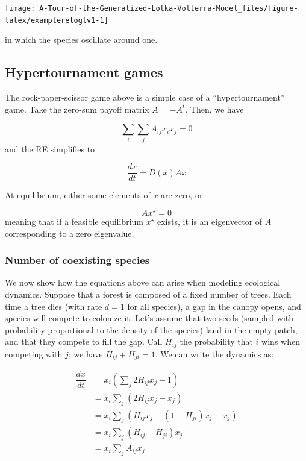 \documentclass[
]{book}
\begin{document}
\begin{center}\texttt{[image: A-Tour-of-the-Generalized-Lotka-Volterra-Model\_files/figure-latex/exampleretoglv1-1]} \end{center}

in which the species oscillate around one.

\hypertarget{hypertournament-games}{%
\subsection{Hypertournament games}\label{hypertournament-games}}

The rock-paper-scissor game above is a simple case of a ``hypertournament'' game. Take the zero-sum payoff matrix \(A = -A^t\). Then, we have

\[
\sum_i \sum_j A_{ij} x_i x_j = 0
\]
and the RE simplifies to

\[
\dfrac{d x}{dt} = D(x) A x
\]

At equilibrium, either some elements of \(x\) are zero, or

\[
A x^\star = 0
\]
meaning that if a feasible equilibrium \(x^\star\) exists, it is an eigenvector of \(A\) corresponding to a zero eigenvalue.

\hypertarget{number-of-coexisting-species}{%
\subsubsection{Number of coexisting species}\label{number-of-coexisting-species}}

We now show how the equations above can arise when modeling ecological dynamics. Suppose that a forest is composed of a fixed number of trees. Each time a tree dies (with rate \(d = 1\) for all species), a gap in the canopy opens, and species will compete to colonize it. Let's assume that two seeds (sampled with probability proportional to the density of the species) land in the empty patch, and that they compete to fill the gap. Call \(H_{ij}\) the probability that \(i\) wins when competing with \(j\); we have \(H_{ij} + H_{ji} = 1\). We can write the dynamics \citep{grilli2017higher} as:

\[
\begin{aligned}
  \dfrac{d x}{dt} &= x_i \left(\sum_j 2 H_{ij} x_j - 1 \right) \\
  &=x_i \sum_j (2 H_{ij} x_j - x_j) \\
  &= x_i \sum_j (H_{ij} x_j  + (1 - H_{ji}) x_j - x_j) \\
  &= x_i \sum_j (H_{ij} - H_{ji}) x_j \\
  &= x_i  \sum_j A_{ij} x_j
\end{aligned}
\]
\end{document}
